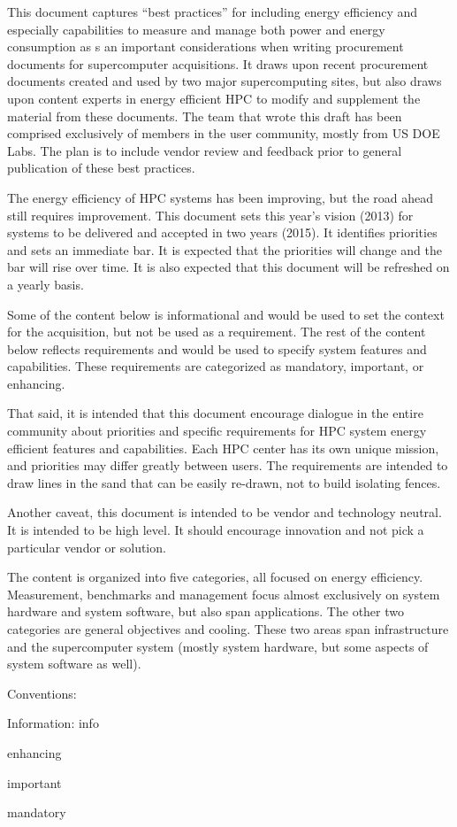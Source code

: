 This document captures ``best practices'' for including energy efficiency and especially capabilities to measure and manage both power and energy consumption as s an important considerations when writing procurement documents for supercomputer acquisitions.  It draws upon recent procurement documents created and used by two major supercomputing sites, but also draws upon content experts in energy efficient HPC to modify and supplement the material from these documents.  The team that wrote this draft has been comprised exclusively of members in the user community, mostly from US DOE Labs.  The plan is to include vendor review and feedback prior to general publication of these best practices.

The energy efficiency of HPC systems has been improving, but the road ahead still requires improvement.  This document sets this year’s vision (2013) for systems to be delivered and accepted in two years (2015).  It identifies priorities and sets an immediate bar.  It is expected that the priorities will change and the bar will rise over time.  It is also expected that this document will be refreshed on a yearly basis.

Some of the content below is informational and would be used to set the context for the acquisition, but not be used as a requirement.  The rest of the content below reflects requirements and would be used to specify system features and capabilities.  These requirements are categorized as mandatory, important, or enhancing. 

That said, it is intended that this document encourage dialogue in the entire community about priorities and specific requirements for HPC system energy efficient features and capabilities. Each HPC center has its own unique mission, and priorities may differ greatly between users. The requirements are intended to draw lines in the sand that can be easily re-drawn, not to build isolating fences. 

Another caveat, this document is intended to be vendor and technology neutral.  It is intended to be high level.  It should encourage innovation and not pick a particular vendor or solution.  

The content is organized into five categories, all focused on energy efficiency.  Measurement, benchmarks and management focus almost exclusively on system hardware and system software, but also span applications.  The other two categories are general objectives and cooling.  These two areas span infrastructure and the supercomputer system (mostly system hardware, but some aspects of system software as well). 

Conventions:

Information: info

\begin{packed_enum}
\item
enhancing
\item
important
\item
mandatory
\end{packed_enum}

